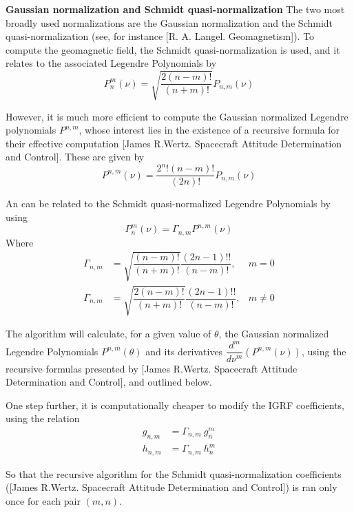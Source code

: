 {\bf Gaussian normalization and Schmidt quasi-normalization}
The two most broadly used normalizations are the Gaussian normalization and the Schmidt quasi-normalization (see, for instance [R. A. Langel. Geomagnetism]).
To compute the geomagnetic field, the Schmidt quasi-normalization is used, and it relates to the associated Legendre Polynomials by
\begin{equation}
P_n^m(\nu) = \sqrt{\dfrac{2(n-m)!}{(n+m)!}} P_{n,m}(\nu) 
\end{equation}

However, it is much more efficient to compute the Gaussian normalized Legendre polynomials $P^{n,m}$, whose interest lies in the existence of a recursive formula for their effective computation [James R.Wertz. Spacecraft Attitude Determination and Control]. These are given by
\begin{equation}
P^{n,m}(\nu) = \dfrac{2^n! (n-m)!}{(2n)!} P_{n,m}(\nu)
\end{equation}

An can be related to the Schmidt quasi-normalized Legendre Polynomials by using
\begin{equation}
P_n^m(\nu) = \Gamma_{n,m} P^{n,m}(\nu)
\end{equation}
Where
\begin{equation}
\begin{aligned}
\Gamma_{n,m} &= \sqrt{\dfrac{(n-m)!}{(n+m)!}}\dfrac{(2n-1)!!}{(n-m)!}, &m = 0\\
\Gamma_{n,m} &= \sqrt{\dfrac{2(n-m)!}{(n+m)!}}\dfrac{(2n-1)!!}{(n-m)!}, &m \neq 0
\end{aligned}
\end{equation}

The algorithm will calculate, for a given value of $\theta$, the Gaussian normalized Legendre Polynomials $P^{n,m}(\theta)$ and its derivatives $\dfrac{d^m}{d\nu^m}(P^{n,m}(\nu))$, using the recursive formulas presented by [James R.Wertz. Spacecraft Attitude Determination and Control], and outlined below.

One step further, it is computationally cheaper to modify the IGRF coefficients, using the relation
\begin{equation}
\begin{aligned}
g_{n,m} &= \Gamma_{n,m}\ g_n^m \\ h_{n,m} &= \Gamma_{n,m}\  h_n^m
\end{aligned}
\end{equation}

So that the recursive algorithm for the Schmidt quasi-normalization coefficients ([James R.Wertz. Spacecraft Attitude Determination and Control]) is ran only once for each pair $(m,n)$.

